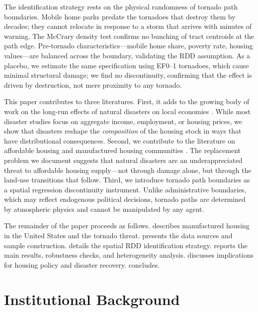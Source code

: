 \documentclass[12pt]{article}
\begin{document}
The identification strategy rests on the physical randomness of tornado path boundaries. Mobile home parks predate the tornadoes that destroy them by decades; they cannot relocate in response to a storm that arrives with minutes of warning. The McCrary density test confirms no bunching of tract centroids at the path edge. Pre-tornado characteristics---mobile home share, poverty rate, housing values---are balanced across the boundary, validating the RDD assumption. As a placebo, we estimate the same specification using EF0--1 tornadoes, which cause minimal structural damage; we find no discontinuity, confirming that the effect is driven by destruction, not mere proximity to any tornado.

This paper contributes to three literatures. First, it adds to the growing body of work on the long-run effects of natural disasters on local economies \citep{deryugina2017fiscal, boustan2020effect, billings2024let}. While most disaster studies focus on aggregate income, employment, or housing prices, we show that disasters reshape the \textit{composition} of the housing stock in ways that have distributional consequences. Second, we contribute to the literature on affordable housing and manufactured housing communities \citep{macinnes2023manufactured, sullivan2018manufactured}. The replacement problem we document suggests that natural disasters are an underappreciated threat to affordable housing supply---not through damage alone, but through the land-use transitions that follow. Third, we introduce tornado path boundaries as a spatial regression discontinuity instrument. Unlike administrative boundaries, which may reflect endogenous political decisions, tornado paths are determined by atmospheric physics and cannot be manipulated by any agent.

The remainder of the paper proceeds as follows.  describes manufactured housing in the United States and the tornado threat.  presents the data sources and sample construction.  details the spatial RDD identification strategy.  reports the main results, robustness checks, and heterogeneity analysis.  discusses implications for housing policy and disaster recovery.  concludes.

\section{Institutional Background}
\label{sec:background}
\end{document}
